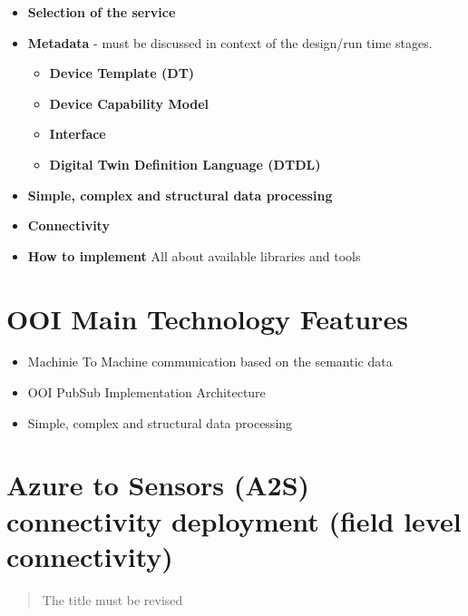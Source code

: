 \documentclass{article}
\providecommand{\tightlist} { \setlength{\itemsep}{0pt}\setlength{\parskip}{0pt}}
\begin{document}
\begin{itemize}
  \tightlist
  \item
        \textbf{Selection of the service}
  \item
        \textbf{Metadata} - must be discussed in context of the design/run
        time stages.

        \begin{itemize}
          \tightlist
          \item
                \textbf{Device Template (DT)}
          \item
                \textbf{Device Capability Model}
          \item
                \textbf{Interface}
          \item
                \textbf{Digital Twin Definition Language (DTDL)}
        \end{itemize}
  \item
        \textbf{Simple, complex and structural data processing}
  \item
        \textbf{Connectivity}
  \item
        \textbf{How to implement} All about available libraries and tools
\end{itemize}

\hypertarget{ooi-main-technology-features}{%
  \section{OOI Main Technology
    Features}\label{ooi-main-technology-features}}

\begin{itemize}
  \tightlist
  \item
        Machinie To Machine communication based on the semantic data
  \item
        OOI PubSub Implementation Architecture
  \item
        Simple, complex and structural data processing
\end{itemize}

\hypertarget{azure-to-sensors-a2s-connectivity-deployment-field-level-connectivity}{%
  \section{Azure to Sensors (A2S) connectivity deployment (field level
    connectivity)}\label{azure-to-sensors-a2s-connectivity-deployment-field-level-connectivity}}

\begin{quote}
  The title must be revised
\end{quote}
\end{document}
